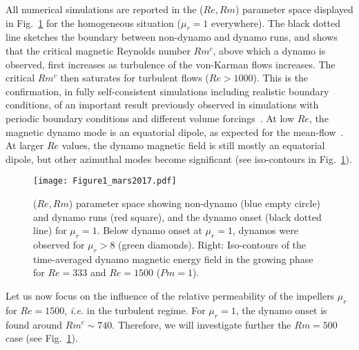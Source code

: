 \documentclass[aps,prl,twocolumn,showpacs,amsmath,amssymb]{revtex4-1}%
\begin{document}
All numerical simulations are reported in the ($Re,Rm$) 
parameter space displayed in Fig.~\ref{fig:parameterspace} for the homogeneous situation ($\mu_r=1$ everywhere).
The black dotted line sketches the boundary between non-dynamo and dynamo runs, and shows that the critical magnetic Reynolds number $Rm^c$, above which a dynamo is observed, first increases as  turbulence of the von-Karman flows increases. The critical $Rm^c$ then saturates for turbulent flows ($Re>1000$). This is the confirmation, in fully self-consistent simulations including realistic boundary conditions, of an important result previously observed in simulations with periodic boundary conditions and different volume forcings~\cite{paper:ponty:2005,mininni_low_2005,paper:schekochihin:2007,ponty2011}. 
At low $Re$, the magnetic dynamo mode is an equatorial dipole, 
as expected for the mean-flow~\cite{paper:ravelet:2005,paper:gissinger:2008.1,paper:giesecke:2010}. 
At larger $Re$ values, the dynamo magnetic field is still mostly an equatorial dipole, but other azimuthal modes become significant (see iso-contours in Fig.~\ref{fig:parameterspace}).


\begin{figure}[t!]
\texttt{[image: Figure1\_mars2017.pdf]}
\caption{($Re,Rm$) parameter space showing non-dynamo (blue empty circle) and dynamo runs (red square), and the dynamo onset (black dotted line) for $\mu_r=1$. Below dynamo onset at $\mu_r=1$, dynamos were observed for $\mu_r > 8$ (green diamonds). Right: Iso-contours of the time-averaged dynamo magnetic energy field in the growing phase for $Re = 333$ and  $Re = 1500$ ($Pm=1$).}
\label{fig:parameterspace}
\end{figure}

Let us now focus on the influence of the relative permeability of the impellers $\mu_r$ for $Re=1500$, 
\textit{i.e.} in the turbulent regime. For $\mu_r = 1$, the dynamo onset is found around $Rm^c \sim 740$. Therefore, we will investigate further the $Rm=500$ case (see Fig.~\ref{fig:parameterspace}).
\end{document}
